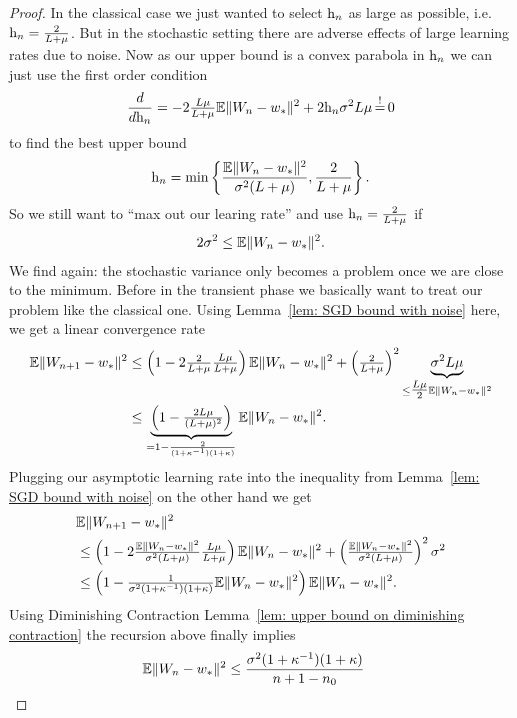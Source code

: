\begin{proof}
	In the classical case we just wanted to select \(\text{h}_n\) as large as possible,
	i.e. \(\text{h}_n=\tfrac{2}{L+\mu}\). But in the stochastic setting there
	are adverse effects of large learning rates due to noise. Now as our upper bound
	is a convex parabola in \(\text{h}_n\) we can just use the first order condition
	\begin{align*}
		\frac{d}{d\lr_n}
		= -2\tfrac{\ubound\lbound}{\ubound+\lbound}
		\E\|\Weights_n - \minimum\|^2 + 2\lr_n \stdBound^2\ubound\lbound
		\xeq{!} 0
	\end{align*}
	to find the best upper bound
	\begin{align}\label{eq: optimal learning rate SGD}
		\text{h}_n
		= \min\left\{
			\frac{\mathbb{E}\|W_n - w_*\|^2}{\sigma^2(L+\mu)},
			\frac{2}{L+\mu}
		\right\}.
	\end{align}
	So we still want to ``max out our learing rate'' and use
	\(\text{h}_n=\tfrac{2}{L+\mu}\) if
	\begin{align*}
		2\sigma^2 \le \mathbb{E}\|W_n - w_*\|^2.
	\end{align*}
	We find again: the stochastic variance only becomes a problem once we are
	close to the minimum. Before in the transient phase we basically want to
	treat our problem like the classical one. Using Lemma~\ref{lem: SGD bound
	with noise} here, we get a linear convergence rate
	\begin{align*}
		\mathbb{E}\|W_{n+1} - w_*\|^2
		&\le \left(1-2\tfrac{2}{L+\mu}\tfrac{L\mu}{L+\mu}\right)
		\mathbb{E}\|W_n - w_*\|^2 + \left(\tfrac{2}{L+\mu}\right)^2
		\underbrace{\sigma^2L\mu}_{
			\le\tfrac{L\mu}{2} \mathbb{E}\|W_n - w_*\|^2
		}\\
		&\le \underbrace{
			\left(1-\tfrac{2L\mu}{(L+\mu)^2}\right)
		}_{
			=1-\frac{2}{(1+\kappa^{-1})(1+\kappa)}
		}
		\mathbb{E}\|W_n - w_*\|^2.
	\end{align*}
	Plugging our asymptotic learning rate into the inequality from Lemma~\ref{lem: SGD bound with noise}
	on the other hand we get
	\begin{align*}
		&\mathbb{E}\|W_{n+1} - w_*\|^2\\
		&\le \left(1-2
			\tfrac{\mathbb{E}\|W_n - w_*\|^2}{\sigma^2(L+\mu)}
			\tfrac{L\mu}{L+\mu}
		\right)
		\mathbb{E}\|W_n - w_*\|^2
		+ \left(
			\tfrac{\mathbb{E}\|W_n - w_*\|^2}{\sigma^2(L+\mu)}
		\right)^2
		\sigma^2\\
		&\le \left(1-
			\tfrac{1}{\sigma^2(1+\kappa^{-1})(1+\kappa)}
			\mathbb{E}\|W_n - w_*\|^2
		\right)
		\mathbb{E}\|W_n - w_*\|^2.
	\end{align*}
	Using Diminishing Contraction Lemma~\ref{lem: upper bound on diminishing
	contraction} the recursion above finally implies
	\begin{align*}
		\mathbb{E}\|W_n - w_*\|^2
		&\le \frac{\sigma^2(1+\kappa^{-1})(1+\kappa)}{n+1-n_0}
		\qedhere
	\end{align*}
\end{proof}

